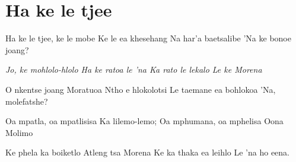 \starttocol
\chapter{Ha ke le tjee}
\nexttocol
\hfill{\it }
\stoptocol
\starttocol
\startlines
{\sc Ha ke} le tjee, ke le mobe
Ke le ea khesehang
Na har'a baetsalibe
'Na ke bonoe joang?

{\it Jo, ke mohlolo-hlolo
Ha ke ratoa le 'na
Ka rato le lekalo
Le ke Morena}

O nkentse joang Moratuoa
Ntho e hlokolotsi
Le taemane ea bohlokoa
'Na, molefatshe?

Oa mpatla, oa mpatlisisa
Ka lilemo-lemo;
Oa mphumana, oa mphelisa
Oona Molimo

Ke phela ka boiketlo
Atleng tsa Morena
Ke ka thaka ea leihlo
Le 'na ho eena.

\stoplines
\nexttocol

\stoptocol
